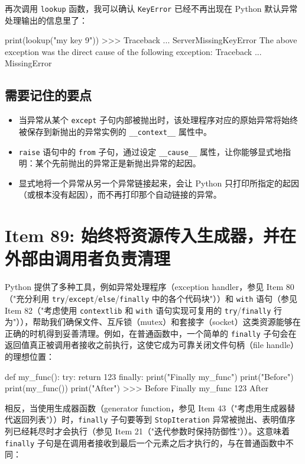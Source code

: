 再次调用 \texttt{lookup} 函数，我可以确认 \texttt{KeyError} 已经不再出现在 Python 默认异常处理输出的信息里了：

\begin{codebox}[python]
print(lookup("my key 9"))
>>>
Traceback ...
ServerMissingKeyError
The above exception was the direct cause of the following
exception:
Traceback ...
MissingError
\end{codebox}

\subsection{需要记住的要点}

\begin{itemize}
\item 当异常从某个 \texttt{except} 子句内部被抛出时，该处理程序对应的原始异常将始终被保存到新抛出的异常实例的 \texttt{\_\_context\_\_} 属性中。
\item \texttt{raise} 语句中的 \texttt{from} 子句，通过设定 \texttt{\_\_cause\_\_} 属性，让你能够显式地指明：某个先前抛出的异常正是新抛出异常的起因。
\item 显式地将一个异常从另一个异常链接起来，会让 Python 只打印所指定的起因（或根本没有起因），而不再打印那个自动链接的异常。
\end{itemize}

\section{Item 89: 始终将资源传入生成器，并在外部由调用者负责清理}

Python 提供了多种工具，例如异常处理程序（exception handler，参见 Item 80（"充分利用 \texttt{try}/\texttt{except}/\texttt{else}/\texttt{finally} 中的各个代码块"））和 \texttt{with} 语句（参见 Item 82（"考虑使用 \texttt{contextlib} 和 \texttt{with} 语句实现可复用的 \texttt{try}/\texttt{finally} 行为"）），帮助我们确保文件、互斥锁（mutex）和套接字（socket）这类资源能够在正确的时机得到妥善清理。例如，在普通函数中，一个简单的 \texttt{finally} 子句会在返回值真正被调用者接收之前执行，这使它成为可靠关闭文件句柄（file handle）的理想位置：

\begin{codebox}[python]
def my_func():
    try:
        return 123
    finally:
        print("Finally my_func")
print("Before")
print(my_func())
print("After")
>>>
Before
Finally my_func
123
After
\end{codebox}

相反，当使用生成器函数（generator function，参见 Item 43（"考虑用生成器替代返回列表"））时，\texttt{finally} 子句要等到 \texttt{StopIteration} 异常被抛出、表明值序列已经耗尽时才会执行（参见 Item 21（"迭代参数时保持防御性"））。这意味着 \texttt{finally} 子句是在调用者接收到最后一个元素之后才执行的，与在普通函数中不同：


